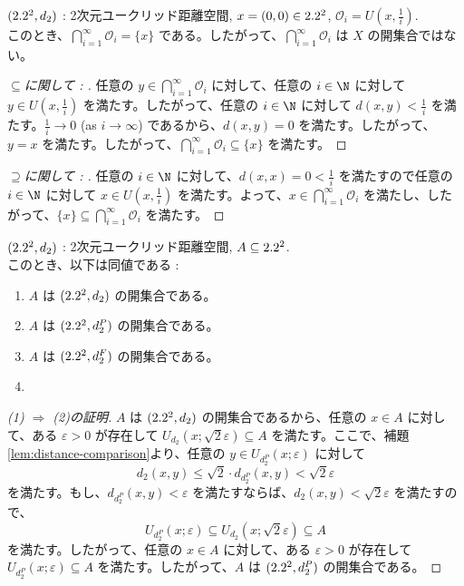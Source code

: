 \documentclass[article,paper=a4paper]{jlreq}
\begin{document}

\begin{ex}
    \quad $(2.2^2, d_2)$ : 2次元ユークリッド距離空間, $x = (0,0) \in 2.2^2$, $\mathcal{O}_i = U\left(x,\frac{1}{i}\right)$.\\
    このとき、$\bigcap_{i=1}^{\infty} \mathcal{O}_i = \{x\}$ である。したがって、$\bigcap_{i=1}^{\infty} \mathcal{O}_i$ は $X$ の開集合ではない。
    \begin{proof}[$\subseteq$に関して : ]
        任意の $y \in \bigcap_{i=1}^{\infty} \mathcal{O}_i$ に対して、任意の $i \in \N$ に対して $y \in U\left(x,\frac{1}{i}\right)$ を満たす。したがって、任意の $i \in \N$ に対して $d(x,y) < \frac{1}{i}$ を満たす。$\frac{1}{i} \to 0$ (as $i \to \infty$) であるから、$d(x,y) = 0$ を満たす。したがって、$y = x$ を満たす。したがって、$\bigcap_{i=1}^{\infty} \mathcal{O}_i \subseteq \{x\}$ を満たす。
    \end{proof}
    \begin{proof}[$\supseteq$に関して : ]
        任意の $i \in \N$ に対して、$d(x,x) = 0 < \frac{1}{i}$ を満たすので任意の $i \in \N$ に対して $x \in U\left(x,\frac{1}{i}\right)$ を満たす。よって、$x \in \bigcap_{i=1}^{\infty} \mathcal{O}_i$ を満たし、したがって、$\{x\} \subseteq \bigcap_{i=1}^{\infty} \mathcal{O}_i$ を満たす。
    \end{proof}
\end{ex}

\begin{prop}
    \quad $(2.2^2, d_2)$ : 2次元ユークリッド距離空間, $A \subseteq 2.2^2$.\\
    このとき、以下は同値である : 
    \begin{enumerate}[label=(\arabic*)\,]
        \item $A$ は $(2.2^2, d_2)$ の開集合である。
        \item $A$ は $(2.2^2, d_2^P)$ の開集合である。
        \item $A$ は $(2.2^2, d_{2}^{F})$ の開集合である。
        \item 
    \end{enumerate}
\end{prop}

\begin{proof}[(1) $\Rightarrow$ (2)の証明]
    $A$ は $(2.2^2, d_2)$ の開集合であるから、任意の $x \in A$ に対して、ある $\varepsilon > 0$ が存在して $U_{d_2}(x;\sqrt{2}\varepsilon) \subseteq A$ を満たす。ここで、補題\ref{lem:distance-comparison}より、任意の $y \in U_{d_2^P}(x;\varepsilon)$ に対して 
    \[d_2(x,y) \leq \sqrt{2}\cdot d_{d_2^P}(x,y) < \sqrt{2}\varepsilon\]
    を満たす。もし、$d_{d_2^P}(x,y) < \varepsilon$ を満たすならば、$d_2(x,y) < \sqrt{2}\varepsilon$ を満たすので、
    \[U_{d_2^P}(x;\varepsilon) \subseteq U_{d_2}(x;\sqrt{2}\varepsilon) \subseteq A\]
    を満たす。したがって、任意の $x \in A$ に対して、ある $\varepsilon > 0$ が存在して $U_{d_2^P}(x;\varepsilon) \subseteq A$ を満たす。したがって、$A$ は $(2.2^2, d_2^P)$ の開集合である。
\end{proof}
\end{document}
